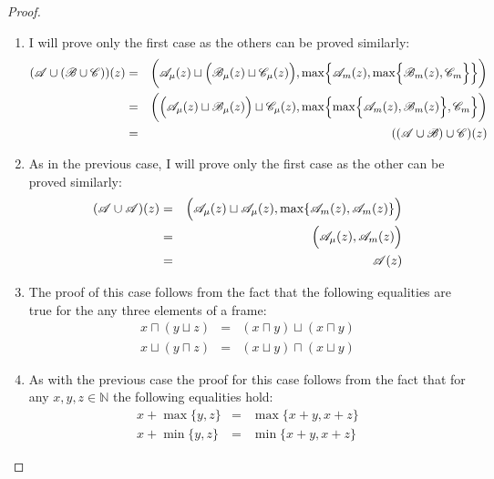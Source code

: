 \documentclass{amsart}
\theoremstyle{definition}
\begin{document}
\begin{proof}
\begin{enumerate}
\item I will prove only the first case as the others can be proved similarly:
\begin{eqnarray*}
(\mathscr{A}\cup(\mathscr{B}\cup\mathscr{C}))(z) &=&
\biggl(\mathscr{A}_{\mu}(z)\sqcup\Bigl(\mathscr{B}_{\mu}(z)\sqcup\mathscr{C}_{\mu}(z)
                                \Bigr),
       \max\Bigl\{\mathscr{A}_{m}(z),\max\Bigl\{\mathscr{B}_{m}(z),\mathscr{C}_{m}\Bigr\}
           \Bigr\}\biggr)\\
&=& \biggl(\Bigl(\mathscr{A}_{\mu}(z)\sqcup\mathscr{B}_{\mu}(z)\Bigr)\sqcup
           \mathscr{C}_{\mu}(z),
       \max\Bigl\{\max\Bigl\{\mathscr{A}_{m}(z),\mathscr{B}_{m}(z)\Bigr\},
           \mathscr{C}_{m}\Bigr\}
           \biggr)\\
&=& ((\mathscr{A}\cup\mathscr{B})\cup\mathscr{C})(z)
\end{eqnarray*}
\item As in the previous case, I will prove only the first case as the other can be proved
 similarly:
\begin{eqnarray*}
(\mathscr{A}\cup\mathscr{A})(z) &=& \Bigl(\mathscr{A}_{\mu}(z)\sqcup\mathscr{A}_{\mu}(z),
                                    \max\{\mathscr{A}_{m}(z),\mathscr{A}_{m}(z)\}\Bigr)\\
&=& \Bigl(\mathscr{A}_{\mu}(z),\mathscr{A}_{m}(z)\Bigr)\\
&=& \mathscr{A}(z)      
\end{eqnarray*}
\item The proof of this case follows from the fact that the following equalities are
true for the any three elements of a frame:
\begin{eqnarray*}
x\sqcap(y\sqcup z) &=& (x\sqcap y)\sqcup(x\sqcap y)\\
x\sqcup(y\sqcap z) &=& (x\sqcup y)\sqcap(x\sqcup y)
\end{eqnarray*}
\item As with the previous case the proof for this case follows from the fact 
that for any $x,y,z\in\mathbb{N}$ the following equalities hold:
\begin{eqnarray*}
x+\max\{y,z\} &=& \max\{x+y, x+z\}\\
x+\min\{y,z\} &=& \min\{x+y, x+z\}
\end{eqnarray*}
\end{enumerate}
\end{proof}
\end{document}
